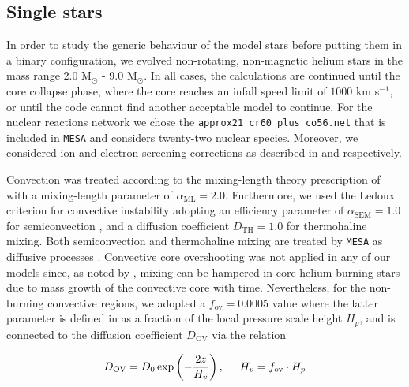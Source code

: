 \documentclass[../../main/thesis_msc.tex]{subfiles}
\begin{document}
    				\subsection{Single stars}
    				
    					In order to study the generic behaviour of the model stars before putting them in a binary configuration, we evolved non-rotating, non-magnetic helium stars in the mass range $2.0$ M$_{\odot}$ - $9.0$ M$_{\odot}$. In all cases, the calculations are continued until the core collapse phase, where the core reaches an infall speed limit of $1000$ km s$^{-1}$, or until the code cannot find another acceptable model to continue. For the nuclear reactions network we chose the \texttt{approx21\_cr60\_plus\_co56.net} that is included in \texttt{MESA} and considers twenty-two nuclear species. Moreover, we considered ion and electron screening corrections as described in \cite{PCR2009} and \cite{Itoh2002} respectively.
    					
    					Convection was treated according to the mixing-length theory prescription of \cite{MLT_Henyey} with a mixing-length parameter of $\alpha_{\text{ML}} = 2.0$. Furthermore, we used the Ledoux criterion for convective instability adopting an efficiency parameter of $\alpha_{\text{SEM}} = 1.0$ for semiconvection \citep{Langer1991}, and a diffusion coefficient $D_{\text{TH}} = 1.0$ for thermohaline mixing. Both semiconvection and thermohaline mixing are treated by \texttt{MESA} as diffusive processes \citep{Langer1983, Kipp_thermohaline}. Convective core overshooting was not applied in any of our models since, as noted by \cite{Tauris_ultra}, mixing can be hampered in core helium-burning stars due to mass growth of the convective core with time. Nevertheless, for the non-burning convective regions, we adopted a $f_{\text{ov}} = 0.0005$ value where the latter parameter is defined in \cite{Herwig2000} as a fraction of the local pressure scale height $H_p$, and is connected to the diffusion coefficient $D_{\text{OV}}$ via the relation
    					
    					\begin{eqnarray}
    						\label{eq:OV_diff}
    						D_{\text{OV}} = D_0 \exp \left( - \frac{2z}{H_v} \right), \hspace{0.5cm} H_v = f_{\text{ov}} \cdot H_p
    					\end{eqnarray}
    					
\end{document}
